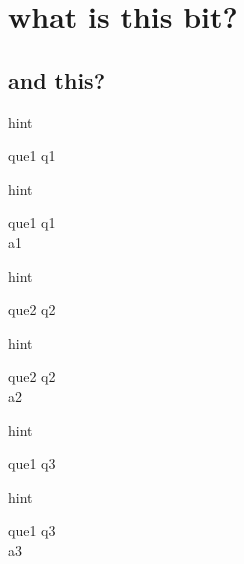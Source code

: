 \documentclass[13.5pt, varwidth=true]{beamer}
\begin{document}
\date{}

\section[topic]{what is this bit?}
\subsection[title]{and this?}

\begin{frame}[shrink=19,fragile]
	hint\\[0.5cm]
	\begin{beamercolorbox}[rounded=true, left, shadow=true,wd=14.8cm]{que1}
		q1 \\[0.3cm]
	\end{beamercolorbox}
\end{frame}
\begin{frame}[shrink=19,fragile]
	hint\\[0.5cm]
	\begin{beamercolorbox}[rounded=true, left, shadow=true,wd=14.8cm]{que1}
		q1 \\[0.3cm]
		\centering
		\textcolor{ared}{a1 }
	\end{beamercolorbox}
\end{frame}

\begin{frame}[shrink=19,fragile]
	hint\\[0.5cm]
	\begin{beamercolorbox}[rounded=true, left, shadow=true,wd=14.8cm]{que2}
		q2 \\[0.3cm]
	\end{beamercolorbox}
\end{frame}
\begin{frame}[shrink=19,fragile]
	hint\\[0.5cm]
	\begin{beamercolorbox}[rounded=true, left, shadow=true,wd=14.8cm]{que2}
		q2 \\[0.3cm]
		\centering
		\textcolor{ared}{a2 }
	\end{beamercolorbox}
\end{frame}

\begin{frame}[shrink=19,fragile]
	hint\\[0.5cm]
	\begin{beamercolorbox}[rounded=true, left, shadow=true,wd=14.8cm]{que1}
		q3 \\[0.3cm]
	\end{beamercolorbox}
\end{frame}
\begin{frame}[shrink=19,fragile]
	hint\\[0.5cm]
	\begin{beamercolorbox}[rounded=true, left, shadow=true,wd=14.8cm]{que1}
		q3 \\[0.3cm]
		\centering
		\textcolor{ared}{a3 }
	\end{beamercolorbox}
\end{frame}
\end{document}
